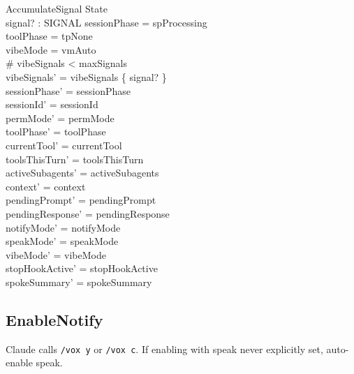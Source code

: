 \documentclass[a4paper,10pt,fleqn]{article}
\begin{document}
\begin{schema}{AccumulateSignal}
  \Delta State \\
  signal? : SIGNAL
  \where
  sessionPhase = spProcessing \\
  toolPhase = tpNone \\
  vibeMode = vmAuto \\
  \# vibeSignals < maxSignals \\
  vibeSignals' = vibeSignals \cup \{ signal? \} \\
  sessionPhase' = sessionPhase \\
  sessionId' = sessionId \\
  permMode' = permMode \\
  toolPhase' = toolPhase \\
  currentTool' = currentTool \\
  toolsThisTurn' = toolsThisTurn \\
  activeSubagents' = activeSubagents \\
  context' = context \\
  pendingPrompt' = pendingPrompt \\
  pendingResponse' = pendingResponse \\
  notifyMode' = notifyMode \\
  speakMode' = speakMode \\
  vibeMode' = vibeMode \\
  stopHookActive' = stopHookActive \\
  spokeSummary' = spokeSummary
\end{schema}

\subsection{EnableNotify}

Claude calls \texttt{/vox y} or \texttt{/vox c}. If enabling with
speak never explicitly set, auto-enable speak.
\end{document}
